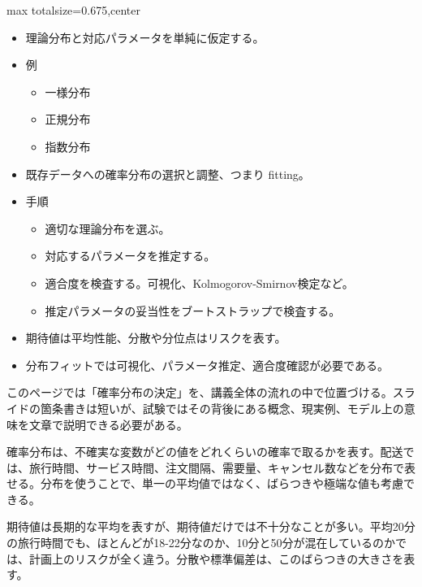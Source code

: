 \clearpage
{}
\begin{adjustbox}{max totalsize={\textwidth}{0.675\textheight},center}
\begin{minipage}{\textwidth}\scriptsize
\begin{minipage}[t]{0.485\textwidth}
\begin{itemize}
\item 理論分布と対応パラメータを単純に仮定する。
\item 例
\begin{itemize}
\item 一様分布
\item 正規分布
\item 指数分布
\end{itemize}
\item 既存データへの確率分布の選択と調整、つまり fitting。
\item 手順
\begin{itemize}
\item 適切な理論分布を選ぶ。
\item 対応するパラメータを推定する。
\item 適合度を検査する。可視化、Kolmogorov-Smirnov検定など。
\item 推定パラメータの妥当性をブートストラップで検査する。
\end{itemize}
\end{itemize}
\begin{itemize}
\item 期待値は平均性能、分散や分位点はリスクを表す。
\item 分布フィットでは可視化、パラメータ推定、適合度確認が必要である。
\end{itemize}
\end{minipage}\hfill
\begin{minipage}[t]{0.485\textwidth}
このページでは「確率分布の決定」を、講義全体の流れの中で位置づける。スライドの箇条書きは短いが、試験ではその背後にある概念、現実例、モデル上の意味を文章で説明できる必要がある。\par
確率分布は、不確実な変数がどの値をどれくらいの確率で取るかを表す。配送では、旅行時間、サービス時間、注文間隔、需要量、キャンセル数などを分布で表せる。分布を使うことで、単一の平均値ではなく、ばらつきや極端な値も考慮できる。\par
期待値は長期的な平均を表すが、期待値だけでは不十分なことが多い。平均20分の旅行時間でも、ほとんどが18-22分なのか、10分と50分が混在しているのかでは、計画上のリスクが全く違う。分散や標準偏差は、このばらつきの大きさを表す。\par

\end{minipage}
\end{minipage}
\end{adjustbox}
